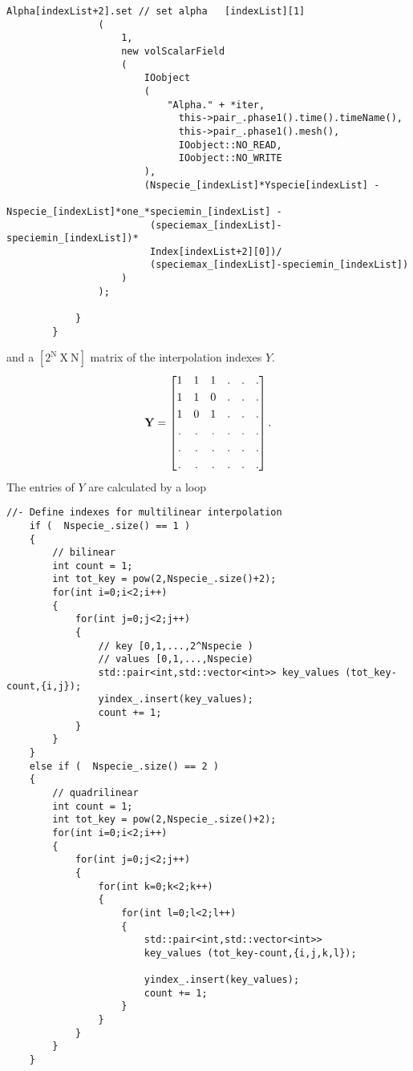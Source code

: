 \documentclass[a4paper, 12 pt, fleqn]{article}
\begin{document}
\begin{lstlisting}[gobble=7]
                Alpha[indexList+2].set // set alpha   [indexList][1]
                (
                    1,
                    new volScalarField
                    (
                        IOobject
                        (
                            "Alpha." + *iter,
	                          this->pair_.phase1().time().timeName(),
	                          this->pair_.phase1().mesh(),
	                          IOobject::NO_READ,
	                          IOobject::NO_WRITE
                        ),
                        (Nspecie_[indexList]*Yspecie[indexList] -
                         Nspecie_[indexList]*one_*speciemin_[indexList] - 
                         (speciemax_[indexList]-speciemin_[indexList])*
                         Index[indexList+2][0])/
                         (speciemax_[indexList]-speciemin_[indexList])
                    )
                );

            }
        }

\end{lstlisting}
and a $[\mathrm{2^N \ X \ N}]$ matrix of the interpolation indexes $Y$. 
\begin{eqnarray}
\bold{Y} = \begin{bmatrix}
       1 & 1 & 1 &. &. &.           \\[0.3em]
       1 & 1 & 0 &. &. &.     \\[0.3em]
       1 & 0 & 1 &. &. &.     \\[0.3em]
       . & . & . &. &. &.    \\[0.3em] 
       . & . & . &. &. &.    \\[0.3em]
       . & . & . &. &. &.       
     \end{bmatrix}. \\
\end{eqnarray}
The entries of $Y$ are calculated by a loop
\begin{lstlisting}[gobble=3]
    //- Define indexes for multilinear interpolation
    if (  Nspecie_.size() == 1 )
    {
        // bilinear
        int count = 1;
        int tot_key = pow(2,Nspecie_.size()+2); 
        for(int i=0;i<2;i++)
        {
            for(int j=0;j<2;j++)
            {
                // key [0,1,...,2^Nspecie )
                // values [0,1,...,Nspecie) 
                std::pair<int,std::vector<int>> key_values (tot_key-count,{i,j});
                yindex_.insert(key_values);
                count += 1;
            } 
        }
    } 
    else if (  Nspecie_.size() == 2 )
    {
        // quadrilinear
        int count = 1;
        int tot_key = pow(2,Nspecie_.size()+2); 
        for(int i=0;i<2;i++)
        {
            for(int j=0;j<2;j++)
            {
                for(int k=0;k<2;k++)
                {
                    for(int l=0;l<2;l++)
                    {
                        std::pair<int,std::vector<int>> 
                        key_values (tot_key-count,{i,j,k,l});
                        
                        yindex_.insert(key_values);
                        count += 1;
                    }
                }
            } 
        }
    } 
\end{lstlisting} 
\end{document}
